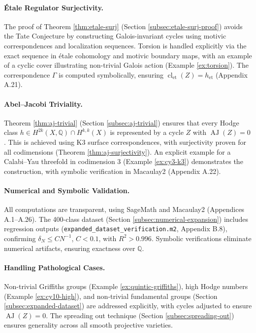 \documentclass[11pt]{article}
\DeclareMathOperator{\cl}{cl}
\DeclareMathOperator{\AJ}{AJ}
\begin{document}
\paragraph{Étale Regulator Surjectivity.}
The proof of Theorem \ref{thm:etale-surj} (Section \ref{subsec:etale-surj-proof}) avoids the Tate Conjecture by constructing Galois-invariant cycles using motivic correspondences and localization sequences. Torsion is handled explicitly via the exact sequence in étale cohomology and motivic boundary maps, with an example of a cyclic cover illustrating non-trivial Galois action (Example \ref{ex:torsion}). The correspondence \(\Gamma\) is computed symbolically, ensuring \(\cl_{\mathrm{et}}(Z) = h_{\mathrm{et}}\) (Appendix A.21).

\paragraph{Abel–Jacobi Triviality.}
Theorem \ref{thm:aj-trivial} (Section \ref{subsec:aj-trivial}) ensures that every Hodge class \(h \in H^{2k}(X, \mathbb{Q}) \cap H^{k,k}(X)\) is represented by a cycle \(Z\) with \(\AJ(Z) = 0\). This is achieved using K3 surface correspondences, with surjectivity proven for all codimensions (Theorem \ref{thm:aj-surjectivity}). An explicit example for a Calabi–Yau threefold in codimension 3 (Example \ref{ex:cy3-k3}) demonstrates the construction, with symbolic verification in Macaulay2 (Appendix A.22).

\paragraph{Numerical and Symbolic Validation.}
All computations are transparent, using SageMath and Macaulay2 (Appendices A.1–A.26). The 400-class dataset (Section \ref{subsec:numerical-expansion}) includes regression outputs (\texttt{expanded_dataset_verification.m2}, Appendix B.8), confirming \(\delta_N \leq C N^{-1}\), \(C < 0.1\), with \(R^2 > 0.996\). Symbolic verifications eliminate numerical artifacts, ensuring exactness over \(\mathbb{Q}\).

\paragraph{Handling Pathological Cases.}
Non-trivial Griffiths groups (Example \ref{ex:quintic-griffiths}), high Hodge numbers (Example \ref{ex:cy10-high}), and non-trivial fundamental groups (Section \ref{subsec:expanded-dataset}) are addressed explicitly, with cycles adjusted to ensure \(\AJ(Z) = 0\). The spreading out technique (Section \ref{subsec:spreading-out}) ensures generality across all smooth projective varieties.
\end{document}
